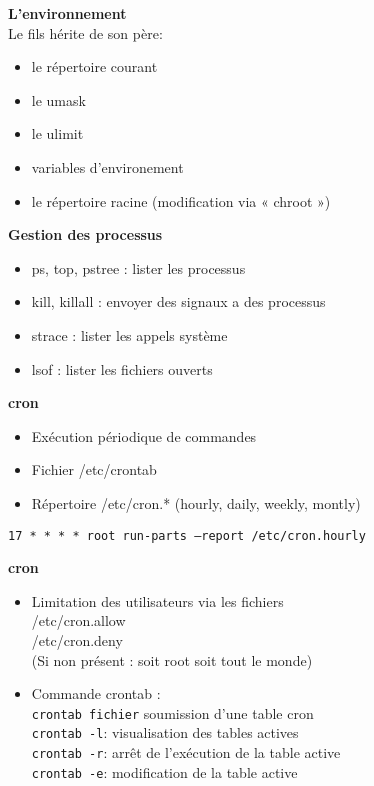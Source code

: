 \documentclass[french]{beamer}
\begin{document}
\begin{frame}
\textbf{L'environnement} \\
Le fils hérite de son père:
\begin{itemize}
\item le répertoire courant
\item le umask
\item le ulimit
\item variables d'environement
\item le répertoire racine (modification via « chroot »)
\end{itemize}
\end{frame}

\begin{frame}
\textbf{Gestion des processus}
\begin{itemize}
\item ps, top, pstree : lister les processus
\item kill, killall : envoyer des signaux a des processus
\item strace : lister les appels système
\item lsof : lister les fichiers ouverts
\end{itemize}
\end{frame}

\begin{frame}
\textbf{cron}
\begin{itemize}
\item Exécution périodique de commandes
\item Fichier /etc/crontab
\item Répertoire /etc/cron.* (hourly, daily, weekly, montly)
\end{itemize}
\texttt{17 * * * * root run-parts --report /etc/cron.hourly}
\end{frame}


\begin{frame}
\textbf{cron}
\begin{itemize}
\item Limitation des utilisateurs via les fichiers\\
/etc/cron.allow\\
/etc/cron.deny\\
(Si non présent : soit root soit tout le monde)\\
\item   Commande crontab : \\
\texttt{crontab fichier} soumission d'une table cron \\
\texttt{crontab -l}: visualisation des tables actives \\
\texttt{crontab -r}: arrêt de l'exécution de la table active \\
\texttt{crontab -e}: modification de la table active \\

\end{itemize}
\end{frame}
\end{document}
